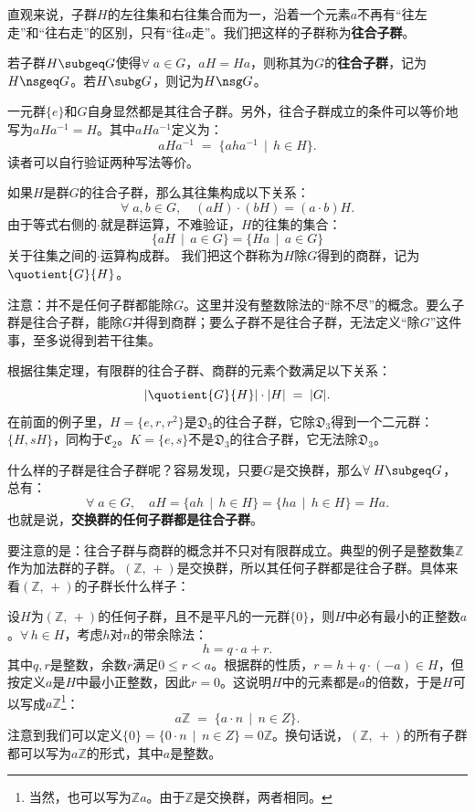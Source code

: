 \documentclass[12pt,UTF8,fontset=none]{ctexbook}
\begin{document}
直观来说，子群$H$的左往集和右往集合而为一，沿着一个元素$a$不再有“往左走”和“往右走”的区别，只有“往$a$走”。我们把这样的子群称为\textbf{往合子群}。
\begin{df}[往合子群]
    若子群$H\subgeq G$使得$\forall \; a\in G$，$aH = Ha$，则称其为$G$的\textbf{往合子群}，记为$H \nsgeq G$。若$H\subg G$，则记为$H \nsg G$。
\end{df}
一元群$\{e\}$和$G$自身显然都是其往合子群。另外，往合子群成立的条件可以等价地写为$aHa^{-1} = H$。其中$aHa^{-1}$定义为：
$$ aHa^{-1} \; =\; \{aha^{-1} \,\mid\, h\in H\}. $$
读者可以自行验证两种写法等价。

如果$H$是群$G$的往合子群，那么其往集构成以下关系：
$$ \forall \; a,b\in G ,\quad (aH)\cdot(bH) = (a\cdot b)H. $$
由于等式右侧的$\cdot$就是群运算，不难验证，$H$的往集的集合：
$$ \{aH\,\mid\, a\in G\} = \{Ha\,\mid\, a\in G\} $$
关于往集之间的$\cdot$运算构成群。
我们把这个群称为$H$除$G$得到的商群，记为$\quotient{G}{H}$。

注意：并不是任何子群都能除$G$。这里并没有整数除法的“除不尽”的概念。要么子群是往合子群，能除$G$并得到商群；要么子群不是往合子群，无法定义“除$G$”这件事，至多说得到若干往集。

根据往集定理，有限群的往合子群、商群的元素个数满足以下关系：
$$ \left|\quotient{G}{H}\right| \cdot |H| \; = \; |G|. $$
在前面的例子里，$H=\{e,r,r^2\}$是$\mathfrak{D}_3$的往合子群，它除$\mathfrak{D}_3$得到一个二元群：$\{H, sH\}$，同构于$\mathfrak{C}_2$。$K=\{e,s\}$不是$\mathfrak{D}_3$的往合子群，它无法除$\mathfrak{D}_3$。

什么样的子群是往合子群呢？容易发现，只要$G$是交换群，那么$\forall \; H\subgeq G$，总有：
$$ \forall \; a \in G,\quad aH = \{ah\,\mid\,h\in H\} = \{ha\,\mid\,h\in H\} = Ha. $$
也就是说，\textbf{交换群的任何子群都是往合子群}。

要注意的是：往合子群与商群的概念并不只对有限群成立。典型的例子是整数集$\mathbb{Z}$作为加法群的子群。$(\mathbb{Z},\,+)$是交换群，所以其任何子群都是往合子群。具体来看$(\mathbb{Z},\,+)$的子群长什么样子：

设$H$为$(\mathbb{Z},\,+)$的任何子群，且不是平凡的一元群$\{0\}$，则$H$中必有最小的正整数$a$。$\forall \, h\in H$，考虑$h$对$n$的带余除法：
$$ h = q\cdot a + r.$$
其中$q,r$是整数，余数$r$满足$0\leqslant r < a$。根据群的性质，$r = h+q\cdot(-a)\in H$，但按定义$a$是$H$中最小正整数，因此$r=0$。这说明$H$中的元素都是$a$的倍数，于是$H$可以写成$a\mathbb{Z}$\footnote{当然，也可以写为$\mathbb{Z}a$。由于$\mathbb{Z}$是交换群，两者相同。}：
$$ a\mathbb{Z} \;=\; \{a\cdot n \,\mid\, n \in Z\}. $$
注意到我们可以定义$\{0\}=\{0\cdot n \,\mid\, n\in Z\}=0\mathbb{Z}$。换句话说，$(\mathbb{Z},\,+)$的所有子群都可以写为$a\mathbb{Z}$的形式，其中$a$是整数。
\end{document}
